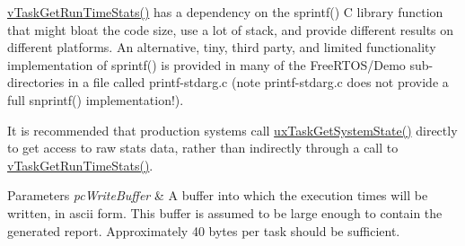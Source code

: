 \mbox{\hyperlink{task_8h_ac34910d5eac69f0538ee218e527663a7}{v\+Task\+Get\+Run\+Time\+Stats()}} has a dependency on the sprintf() C library function that might bloat the code size, use a lot of stack, and provide different results on different platforms. An alternative, tiny, third party, and limited functionality implementation of sprintf() is provided in many of the Free\+R\+T\+O\+S/\+Demo sub-\/directories in a file called printf-\/stdarg.\+c (note printf-\/stdarg.\+c does not provide a full snprintf() implementation!).

It is recommended that production systems call \mbox{\hyperlink{task_8h_ade68760111c37287a3b82c41dff8ec7d}{ux\+Task\+Get\+System\+State()}} directly to get access to raw stats data, rather than indirectly through a call to \mbox{\hyperlink{task_8h_ac34910d5eac69f0538ee218e527663a7}{v\+Task\+Get\+Run\+Time\+Stats()}}.


\begin{DoxyParams}{Parameters}
{\em pc\+Write\+Buffer} & A buffer into which the execution times will be written, in ascii form. This buffer is assumed to be large enough to contain the generated report. Approximately 40 bytes per task should be sufficient. \\
\hline
\end{DoxyParams}
